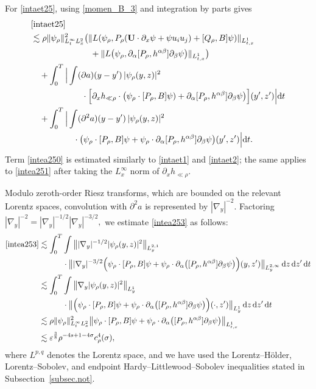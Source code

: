 \documentclass[11pt,letterpaper,reqno]{amsart}
\numberwithin{equation}{section}
\theoremstyle{definition}
\theoremstyle{remark}
\newcommand{\pa}{\partial}
\begin{document}
For \eqref{intaet25},  using \eqref{momen_B_3} and integration by parts gives
\begin{align}
    &\eqref{intaet25}\nonumber\\  
  & \lesssim\rho\|\psi_\rho\|_{L^\infty_t L^2_x}^2 \big(\| L(\psi_\rho, P_\rho (\mathbf{U} \cdot \partial_x \psi+\psi  u_i u_j)+ [Q_\rho , B]\psi  ) \|_{L^1_{t,x}}\label{intea250}\\
  &\qquad \qquad \qquad\quad    +\|L\big(\psi_\rho, \pa_\alpha[P_\rho, h^{\alpha\beta }]\pa_\beta \psi  \big)\|_{L^1_{t,x}}\big) \nonumber\\
    &\quad +\int_0^T \Big| \int (\pa a )(y-y')\, |\psi_\rho(y,z)|^2 \label{intea251}\\
    &\qquad \qquad\qquad \cdot \Big[\pa_x h_{\ll \rho} \cdot \big( \psi_\rho \cdot [P_\rho, B]\psi) + \pa_\alpha[P_\rho, h^{\alpha\beta }]\pa_\beta \psi \big)\Big](y',z') \Big|\mathrm{d}t\nonumber\\
    &\quad + \int_0^T \Big| \int (\pa^2 a )(y-y')\, |\psi_\rho(y,z)|^2    \label{intea253}\\
    &\qquad \qquad\quad  \cdot \big( \psi_\rho \cdot [P_\rho, B]\psi + \psi_\rho \cdot \pa_\alpha[P_\rho, h^{\alpha\beta }]\pa_\beta \psi \big) (y',z') \Big|\mathrm{d}t.\nonumber
\end{align}
Term \eqref{intea250} is estimated similarly to \eqref{intaet1} and \eqref{intaet2}; the same applies to \eqref{intea251} after taking the $L^\infty_x $ norm of $\pa_x h_{\ll \rho}$.
 
 Modulo zeroth-order Riesz transforms, which are bounded on the relevant Lorentz spaces, convolution with \(\partial^2a\) is represented by \(|\nabla_y|^{-2}\).  Factoring
\(
|\nabla_y|^{-2}
=
|\nabla_y|^{-1/2}|\nabla_y|^{-3/2},
\)
we estimate \eqref{intea253} as follows:
\begin{align*}
\eqref{intea253}
&\lesssim
\int_0^T\int
\big\|
|\nabla_y|^{-1/2}|\psi_\rho(y,z)|^2
\big\|_{L_y^{2,1}}
\\
&\qquad\quad\cdot
\big\|
|\nabla_y|^{-3/2}
\Big(
\psi_\rho\cdot[P_\rho,B]\psi
+
\psi_\rho\cdot
\partial_\alpha
\big([P_\rho,h^{\alpha\beta}]\partial_\beta\psi\big)
\Big)(y,z')
\big\|_{L_y^{2,\infty}}
\,\mathrm dz\,\mathrm dz'\,\mathrm dt
\\
&\lesssim
\int_0^T\int
\big\|
\nabla_y|\psi_\rho(y,z)|^2
\big\|_{L_y^1}
\\
&\qquad\quad\cdot
\big\|
\Big(
\psi_\rho\cdot[P_\rho,B]\psi
+
\psi_\rho\cdot
\partial_\alpha
\big([P_\rho,h^{\alpha\beta}]\partial_\beta\psi\big)
\Big)(\cdot,z')
\big\|_{L_y^1}
\,\mathrm dz\,\mathrm dz'\,\mathrm dt
\\
&\lesssim
\rho\|\psi_\rho\|_{L_t^\infty L_x^2}^2
\big\|
\psi_\rho\cdot[P_\rho,B]\psi
+
\psi_\rho\cdot
\partial_\alpha
\big([P_\rho,h^{\alpha\beta}]\partial_\beta\psi\big)
\big\|_{L_{t,x}^1}
\\
&\lesssim
\varepsilon^{\frac38}
\rho^{-4s+1-4\sigma}c_\rho^4(\sigma),
\end{align*}
where \(L^{p,q}\) denotes the Lorentz space, and we have used the
Lorentz--Hölder, Lorentz--Sobolev, and endpoint
Hardy--Littlewood--Sobolev inequalities stated in
Subsection~\ref{subsec.not}.
\end{document}
